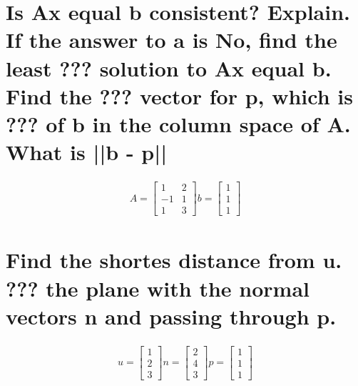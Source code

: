 \documentclass{assignment}
\begin{document}
\section{Is Ax equal b consistent? Explain. If the answer to a is No, find the least ??? solution to Ax equal b. Find the ??? vector for p, which is ??? of b in the column space of A. What is ||b - p||}

\begin{align}
    A = \begin{bmatrix}
        1 & 2 \\
        -1 & 1 \\
        1 & 3
    \end{bmatrix}
    b = \begin{bmatrix}
        1 \\
        1 \\
        1
    \end{bmatrix}
\end{align}

\newpage

\section{Find the shortes distance from u. ??? the plane with the normal vectors n and passing through p.}
\begin{align}
    u = \begin{bmatrix}
        1 \\
        2 \\
        3
    \end{bmatrix}
    n = \begin{bmatrix}
        2 \\
        4 \\
        3
    \end{bmatrix}
    p = \begin{bmatrix}
        1 \\
        1 \\
        1
    \end{bmatrix}
\end{align}
\end{document}
